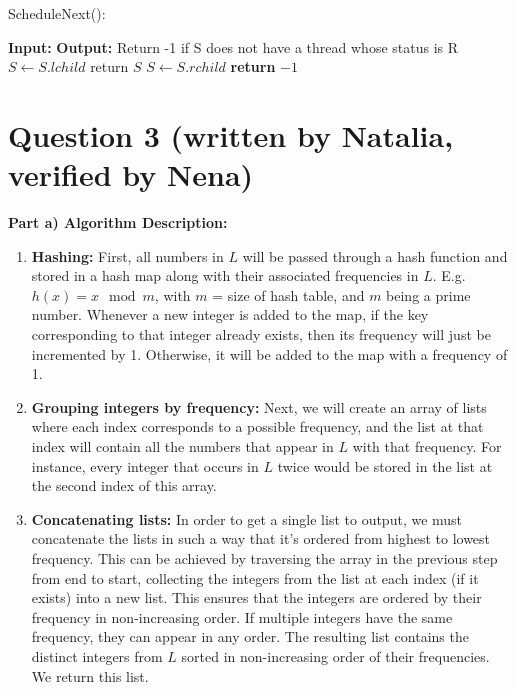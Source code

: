 \documentclass[11pt, a4paper]{article}
\begin{document}
\begin{algorithm} [H]
\caption{ScheduleNext():}
\begin{algorithmic}[1]
\State \textbf{Input:}
\State \textbf{Output:} Return -1 if S does not have a thread whose status is R
\\
                \State $S \gets S.lchild$
                \State return $S$
            \Else
                \State $S \gets S.rchild$
            \EndIf
        \EndWhile
    \Else
        \State \textbf{return} $-1$
    \EndIf

\end{algorithmic}
\end{algorithm}

\section*{Question 3 (written by Natalia, verified by Nena)}

\textbf{Part a) Algorithm Description:}
\begin{enumerate}
    \item \textbf{Hashing:} First, all numbers in \( L \) will be passed through a hash function and stored in a hash map along with their associated frequencies in \( L \). E.g. \(h(x) = x \mod m\), with \(m\) = size of hash table, and \(m\) being a prime number. Whenever a new integer is added to the map, if the key corresponding to that integer already exists, then its frequency will just be incremented by 1. Otherwise, it will be added to the map with a frequency of 1.
    \item \textbf{Grouping integers by frequency:} Next, we will create an array of lists where each index corresponds to a possible frequency, and the list at that index will contain all the numbers that appear in \( L \) with that frequency. For instance, every integer that occurs in \( L \) twice would be stored in the list at the second index of this array.
    \item \textbf{Concatenating lists:} In order to get a single list to output, we must concatenate the lists in such a way that it's ordered from highest to lowest frequency. This can be achieved by traversing the array in the previous step from end to start, collecting the integers from the list at each index (if it exists) into a new list. This ensures that the integers are ordered by their frequency in non-increasing order. If multiple integers have the same frequency, they can appear in any order. The resulting list contains the distinct integers from \( L \) sorted in non-increasing order of their frequencies. We return this list.
\end{enumerate}
\end{document}
